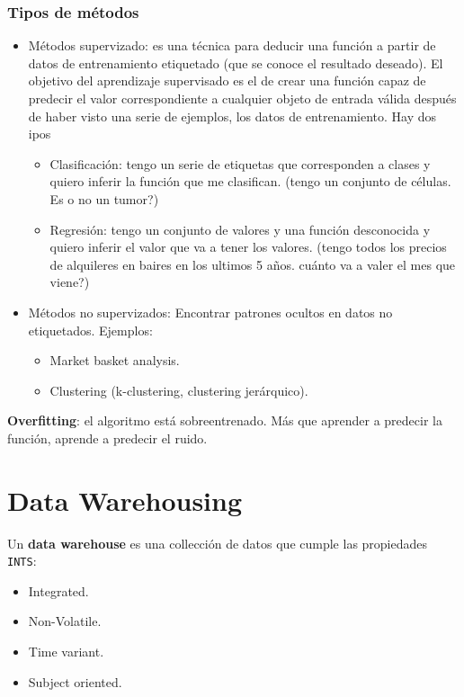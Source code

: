 \documentclass[]{article}
\begin{document}
\subsubsection{Tipos de métodos}
\begin{itemize}
    \item Métodos supervizado: es una técnica para deducir una función a partir de datos de entrenamiento etiquetado (que se conoce el resultado deseado). El objetivo del aprendizaje supervisado es el de crear una función capaz de predecir el valor correspondiente a cualquier objeto de entrada válida después de haber visto una serie de ejemplos, los datos de entrenamiento. Hay dos ipos
    \begin{itemize}
        \item Clasificación: tengo un serie de etiquetas que corresponden a clases y quiero inferir la función que me clasifican. (tengo un conjunto de células. Es o no un tumor?)
        \item Regresión: tengo un conjunto de valores y una función desconocida y quiero inferir el valor que va a tener los valores. (tengo todos los precios de alquileres en baires en los ultimos 5 años. cuánto va a valer el mes que viene?)
    \end{itemize}
    \item Métodos no supervizados: Encontrar patrones ocultos en datos no etiquetados. Ejemplos:
    \begin{itemize}
        \item Market basket analysis.
        \item Clustering (k-clustering, clustering jerárquico).
    \end{itemize}
\end{itemize}

\textbf{Overfitting}: el algoritmo está sobreentrenado. Más que aprender a predecir la función, aprende a predecir el ruido.


\section{Data Warehousing}
Un \textbf{data warehouse} es una collección de datos que cumple las propiedades \texttt{INTS}:
\begin{itemize}
    \item Integrated.
    \item Non-Volatile.
    \item Time variant.
    \item Subject oriented.
\end{itemize}
\end{document}
